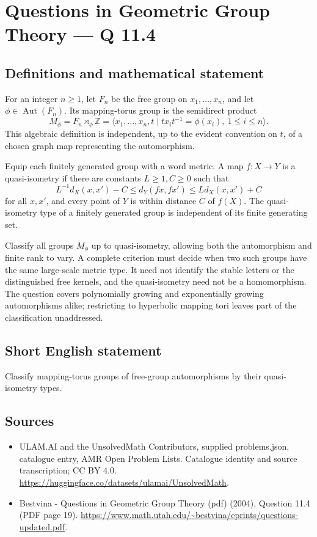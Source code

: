 \documentclass[11pt,a4paper]{article}
\begin{document}
\section*{Questions in Geometric Group Theory — Q 11.4}\label{statement}

\subsection{Definitions and mathematical statement}
For an integer $n\geq1$, let $F_n$ be the free group on $x_1,\ldots,x_n$, and let $\phi\in\operatorname{Aut}(F_n)$. Its mapping-torus group is the semidirect product
\[
 M_\phi=F_n\rtimes_\phi\mathbb Z
 =\langle x_1,\ldots,x_n,t\mid
                   tx_it^{-1}=\phi(x_i),\ 1\leq i\leq n\rangle.
\]
This algebraic definition is independent, up to the evident convention on $t$, of a chosen graph map representing the automorphism.

Equip each finitely generated group with a word metric. A map $f:X\to Y$ is a quasi-isometry if there are constants $L\geq1,C\geq0$ such that
\[
 L^{-1}d_X(x,x')-C\leq d_Y(fx,fx')\leq Ld_X(x,x')+C
\]
for all $x,x'$, and every point of $Y$ is within distance $C$ of $f(X)$. The quasi-isometry type of a finitely generated group is independent of its finite generating set.

Classify all groups $M_\phi$ up to quasi-isometry, allowing both the automorphism and finite rank to vary. A complete criterion must decide when two such groups have the same large-scale metric type. It need not identify the stable letters or the distinguished free kernels, and the quasi-isometry need not be a homomorphism. The question covers polynomially growing and exponentially growing automorphisms alike; restricting to hyperbolic mapping tori leaves part of the classification unaddressed.
\subsection{Short English statement}
Classify mapping-torus groups of free-group automorphisms by their quasi-isometry types.
\subsection{Sources}
\begin{itemize}
\item[S1] ULAM.AI and the UnsolvedMath Contributors, supplied problems.json, catalogue entry, AMR Open Problem Lists. Catalogue identity and source transcription; CC BY 4.0.
\url{https://huggingface.co/datasets/ulamai/UnsolvedMath}.
\item[S2] Bestvina - Questions in Geometric Group Theory (pdf) (2004), Question 11.4 (PDF page 19). 
\url{https://www.math.utah.edu/~bestvina/eprints/questions-updated.pdf}.
\end{itemize}
\end{document}
